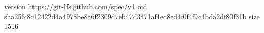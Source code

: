 version https://git-lfs.github.com/spec/v1
oid sha256:8c12422d4a4978be8a6f2309d7eb47d3471af1ec8ed4f0f4f9c4bda2df80f31b
size 1516
